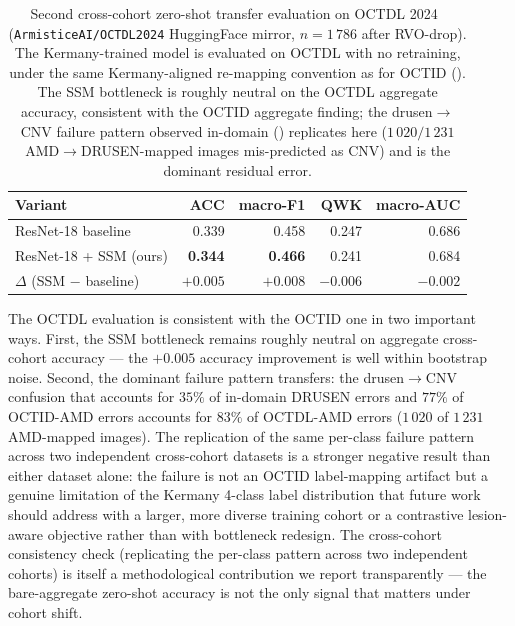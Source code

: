 \documentclass[5p]{elsarticle}
\begin{document}
\begin{table}[t]
\centering\small
\caption{Second cross-cohort zero-shot transfer evaluation on OCTDL 2024~\citep{kulyabin2024octdl} (\texttt{ArmisticeAI/OCTDL2024} HuggingFace mirror, $n=1\,786$ after RVO-drop). The Kermany-trained model is evaluated on OCTDL with no retraining, under the same Kermany-aligned re-mapping convention as for OCTID (). The SSM bottleneck is roughly neutral on the OCTDL aggregate accuracy, consistent with the OCTID aggregate finding; the drusen$\rightarrow$CNV failure pattern observed in-domain () replicates here ($1\,020/1\,231$ AMD$\rightarrow$DRUSEN-mapped images mis-predicted as CNV) and is the dominant residual error.}
\label{tab:octdl}
\setlength{\tabcolsep}{6pt}
\begin{tabular}{l rrrr}
\toprule
Variant & ACC & macro-F1 & QWK & macro-AUC \\
\midrule
ResNet-18 baseline       & 0.339 & 0.458 & 0.247 & 0.686 \\
ResNet-18 + SSM (ours)   & \textbf{0.344} & \textbf{0.466} & 0.241 & 0.684 \\
$\Delta$ (SSM $-$ baseline) & $+0.005$ & $+0.008$ & $-0.006$ & $-0.002$ \\
\bottomrule
\end{tabular}
\end{table}

The OCTDL evaluation is consistent with the OCTID one in two important ways. First, the SSM bottleneck remains roughly neutral on aggregate cross-cohort accuracy --- the $+0.005$ accuracy improvement is well within bootstrap noise. Second, the dominant failure pattern transfers: the drusen$\rightarrow$CNV confusion that accounts for $35\%$ of in-domain DRUSEN errors and $77\%$ of OCTID-AMD errors accounts for $83\%$ of OCTDL-AMD errors ($1\,020$ of $1\,231$ AMD-mapped images). The replication of the same per-class failure pattern across two independent cross-cohort datasets is a stronger negative result than either dataset alone: the failure is not an OCTID label-mapping artifact but a genuine limitation of the Kermany 4-class label distribution that future work should address with a larger, more diverse training cohort or a contrastive lesion-aware objective rather than with bottleneck redesign. The cross-cohort consistency check (replicating the per-class pattern across two independent cohorts) is itself a methodological contribution we report transparently --- the bare-aggregate zero-shot accuracy is not the only signal that matters under cohort shift.
\end{document}
